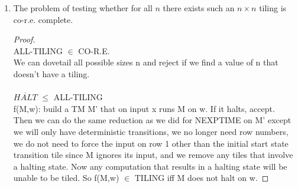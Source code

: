 \documentclass[12pt]{article}
\begin{document}
\begin{enumerate}
\begin{enumerate}
\begin{proof}
\end{proof}
\item The problem of testing whether for all $n$ there exists such an $n\times n$ tiling is
  co-r.e. complete.  \\
  \begin{proof}\\
  	ALL-TILING $\in$ CO-R.E. \\
  	We can dovetail all possible sizes n and reject if we find a value of n that doesn't have a tiling.\\
  	\\
  	$\overline{HALT}$ $\leq$ ALL-TILING \\
  	f(M,w): build a TM M' that on input x runs M on w.  If it halts, accept.\\
  	Then we can do the same reduction as we did for NEXPTIME on M' except we will only have deterministic transitions, we no longer need row numbers, we do not need to force the input on row 1 other than the initial start state transition tile since M ignores its input, and we remove any tiles that involve a halting state. Now any computation that results in a halting state will be unable to be tiled.  So f(M,w) $\in$ TILING iff M does not halt on w.
  	
  \end{proof}
  
\end{enumerate}

\end{enumerate}
\end{document}

